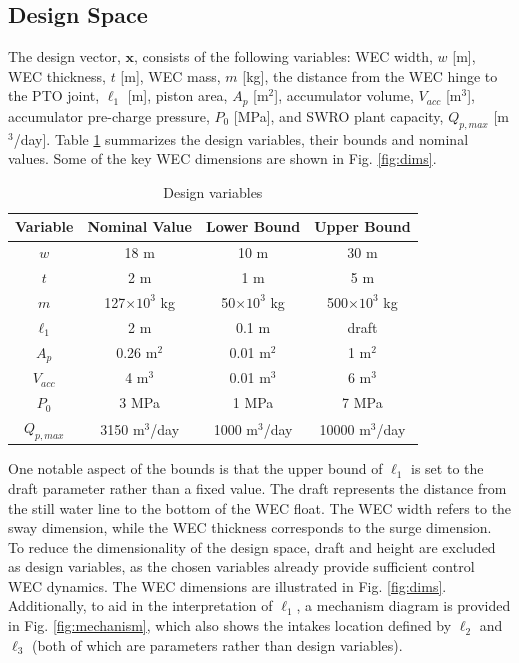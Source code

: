 \documentclass[twocolumn,10pt]{asme2e}
\begin{document}
\subsection{Design Space}
The design vector, $\mathbf{x}$, consists of the following variables: WEC width, $w$ [m], WEC thickness, $t$ [m], WEC mass, $m$ [kg], the distance from the WEC hinge to the PTO joint, $\ell_1$ [m], piston area, $A_p$ [m$^2$], accumulator volume, $V_{acc}$ [m$^3$], accumulator pre-charge pressure, $P_0$ [MPa], and SWRO plant capacity, $Q_{p,max}$ [m$^3$/day]. Table \ref{tab:design_space} summarizes the design variables, their bounds and nominal values. Some of the key WEC dimensions are shown in Fig. \ref{fig:dims}.
\begin{table}[h]
    \centering
    \caption{Design variables}
    \begin{tabular}{|c|c|c|c|}
        \hline
        Variable & Nominal Value & Lower Bound & Upper Bound\\
        \hline
        $w$ & 18 m & 10 m & 30 m \\
        $t$ & 2 m & 1 m & 5 m \\
        $m$ & 127$\times10^3$ kg & 50$\times10^3$ kg & 500$\times10^3$ kg \\
        $\ell_1$ & 2 m & 0.1 m & draft \\
        $A_p$ & 0.26 m$^2$ & 0.01 m$^2$ & 1 m$^2$ \\
        $V_{acc}$ & 4 m$^3$ & 0.01 m$^3$ & 6 m$^3$ \\
        $P_0$ & 3 MPa & 1 MPa & 7 MPa \\
        $Q_{p,max}$ & 3150 m$^3$/day & 1000 m$^3$/day & 10000 m$^3$/day\\
        \hline
    \end{tabular}
    \label{tab:design_space} 
\end{table}

One notable aspect of the bounds is that the upper bound of $\ell_1$ is set to the draft parameter rather than a fixed value. The draft represents the distance from the still water line to the bottom of the WEC float. The WEC width refers to the sway dimension, while the WEC thickness corresponds to the surge dimension. To reduce the dimensionality of the design space, draft and height are excluded as design variables, as the chosen variables already provide sufficient control WEC dynamics. The WEC dimensions are illustrated in Fig. \ref{fig:dims}. Additionally, to aid in the interpretation of $\ell_1$, a mechanism diagram is provided in Fig. \ref{fig:mechanism}, which also shows the intakes location defined by $\ell_2$ and $\ell_3$ (both of which are parameters rather than design variables).
\end{document}
